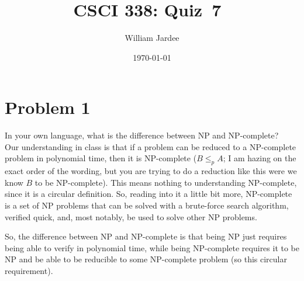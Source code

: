 \documentclass[11pt]{article}
\begin{document}
\graphicspath{{../images/}}

\title{CSCI 338: Quiz~7~}
\author{William Jardee}
\date{\today}
\maketitle


\section*{Problem 1}
    In your own language, what is the difference between NP and NP-complete?\\
    
    Our understanding in class is that if a problem can be reduced to a NP-complete problem in polynomial time, then it is NP-complete ($B \leq_p A$; I am hazing on the exact order of the wording, but you are trying to do a reduction like this were we know $B$ to be NP-complete). This means nothing to understanding NP-complete, since it is a circular definition. So, reading into it a little bit more, NP-complete is a set of NP problems that can be solved with a brute-force search algorithm, verified quick, and, most notably, be used to solve other NP problems. 
    
    So, the difference between NP and NP-complete is that being NP just requires being able to verify in polynomial time, while being NP-complete requires it to be NP and be able to be reducible to some NP-complete problem (so this circular requirement). 
\end{document}
